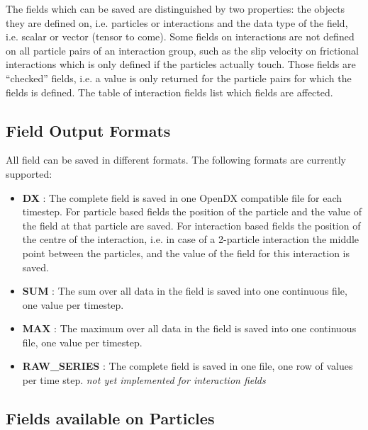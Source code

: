 \documentclass{manual}
\begin{document}
The fields which can be saved are distinguished by two properties: the objects they are defined on, i.e. particles or interactions and the data type of the field, i.e. scalar or vector (tensor to come). Some fields on interactions are not defined on all particle pairs of an interaction group, such as the slip velocity on frictional interactions which is only defined if the particles actually touch. Those fields are ``checked'' fields, i.e. a value is only returned for the particle pairs for which the fields is defined. The table of interaction fields list which fields are affected.


\subsection{Field Output Formats}
\label{sec::OutputFormats}

All field can be saved in different formats. The following formats are currently supported:
   
\begin{itemize}
\item \textbf{DX} : The complete field is saved in one OpenDX compatible file for each timestep. For particle based fields  the position of the particle and the value of the field at that particle are saved. For interaction based fields the position of the centre of the interaction, i.e. in case of a 2-particle interaction the middle point between the particles, and the value of the field for this interaction is saved.
\item \textbf{SUM} : The sum over all data in the field is saved into one continuous file, one value per timestep.
\item \textbf{MAX} : The maximum over all data in the field is saved into one continuous file, one value per timestep. 
\item \textbf{RAW\_SERIES} : The complete field is saved in one file, one row of values per time step. \textit{not yet implemented for interaction fields} 
\end{itemize}
\subsection{Fields available on Particles}
\par \medskip
\end{document}

